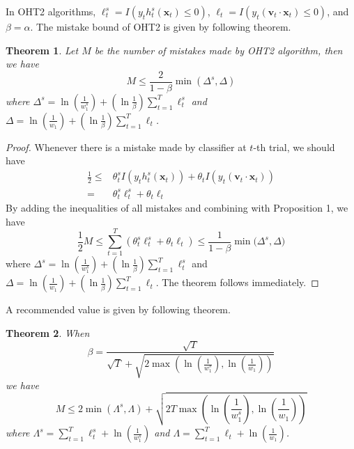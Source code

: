 \documentclass{article} %
\newtheorem{thm}{Theorem}
\theoremstyle{remark}
\theoremstyle{definition}
\begin{document}
In OHT2 algorithms, $\ell_{t}^{s} = I(y_t h_{t}^{s}(\mathbf{x}_t) \leq 0)$, $\ell_t = I(y_t (\mathbf{v}_t \cdot \mathbf{x}_t) \leq 0)$, and $\beta = \alpha$.
The mistake bound of OHT2 is given by following theorem.

\begin{thm}
Let $M$ be the number of mistakes made by OHT2 algorithm, then we have 
$$ M \leq \frac{2}{1-\beta} \min (\varDelta^s, \varDelta) $$
where
$ \varDelta^s = \ln(\frac{1}{w_{1}^{s}}) + (\ln \frac{1}{\beta}) \sum\limits_{t=1}^{T} \ell_{t}^{s} $ and $ \varDelta = \ln(\frac{1}{w_{1}}) + (\ln \frac{1}{\beta}) \sum\limits_{t=1}^{T} \ell_{t} $.
\end{thm}

\begin{proof}
Whenever there is a mistake made by classifier at $t$-th trial, we should have
\begin{equation*}
\begin{split}
\frac{1}{2} \leq
  & \theta_{t}^{s} I(y_t h_{t}^{s}(\mathbf{x}_t)) + \theta_t I(y_t (\mathbf{v}_t \cdot \mathbf{x}_t)) \\
= & \theta_{t}^{s} \ell_{t}^{s} + \theta_t \ell_t
\end{split}
\end{equation*}
By adding the inequalities of all mistakes and combining with Proposition 1, we have
$$ \frac{1}{2}M \leq \sum\limits_{t=1}^{T} ( \theta_{t}^{s} \ell_{t}^{s} + \theta_t \ell_t ) \leq \frac{1}{1-\beta} \min \big( \varDelta^s, \varDelta \big) $$
where
$ \varDelta^s = \ln(\frac{1}{w_{1}^{s}}) + (\ln \frac{1}{\beta}) \sum\limits_{t=1}^{T} \ell_{t}^{s} $ and $ \varDelta = \ln(\frac{1}{w_{1}}) + (\ln \frac{1}{\beta}) \sum\limits_{t=1}^{T} \ell_{t} $.
The theorem follows immediately.
\end{proof}

A recommended value is given by following theorem.

\begin{thm}
When 
$$ \beta = \frac{\sqrt{T}}{\sqrt{T} + \sqrt{2 \max (\ln(\frac{1}{w_{1}^{s}}), \ln(\frac{1}{w_1}))}} $$
we have 
$$ M \leq 2 \min (\varLambda^s, \varLambda) + \sqrt{2T \max (\ln(\frac{1}{w_{1}^{s}}), \ln(\frac{1}{w_1}))} $$
where $\varLambda^s = \sum\limits_{t=1}^{T}\ell_{t}^{s} + \ln(\frac{1}{w_{1}^{s}})$ and $\varLambda = \sum\limits_{t=1}^{T}\ell_{t} + \ln(\frac{1}{w_1})$.
\end{thm}
\end{document}
